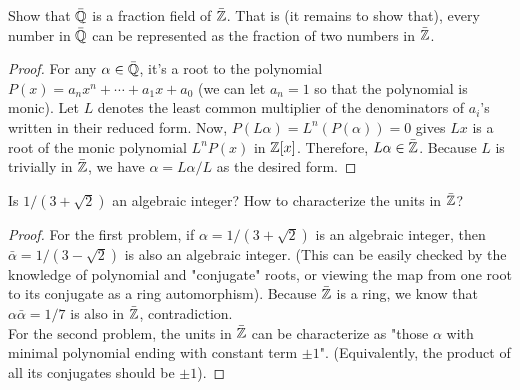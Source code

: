 \documentclass[12pt,twoside=semi,openright,numbers=noenddot]{scrbook}
\begin{document}
\begin{problem}
    Show that $\bar{\mathbb Q}$ is a fraction field of $\bar{\mathbb Z}$. That is (it remains to show that), every number in $\bar{\mathbb Q}$ can be 
    represented as the fraction of two numbers in $\bar{\mathbb Z}$.
\end{problem}
    \begin{proof}
        For any $\alpha \in \bar{\mathbb Q}$, it's a root to the polynomial $P(x) = a_n x^n + \cdots + a_1 x + a_0$ (we can let 
        $a_n = 1$ so that the polynomial is monic). 
        Let $L$ denotes the least common multiplier of the denominators of $a_i$'s written in their reduced form. 
        Now, $P(L\alpha) = L^n(P(\alpha)) = 0$ gives $Lx$ is a root of the monic polynomial $L^n P(x)$ in $\mathbb Z[x]$. Therefore, 
        $L\alpha \in \bar{\mathbb Z}$. Because $L$ is trivially in $\bar{\mathbb Z}$, we have $\alpha = L\alpha / L$ as the desired form.
    \end{proof}

\begin{problem}
    Is $1/(3+\sqrt{2})$ an algebraic integer? How to characterize the units in $\bar{\mathbb Z}$?
\end{problem}
    \begin{proof}
        For the first problem, if $\alpha = 1/(3+\sqrt{2})$ is an algebraic integer, then 
        $\bar{\alpha} = 1/(3-\sqrt{2})$ is also an algebraic integer. (This can be easily checked by the knowledge of polynomial and 
        "conjugate" roots, or viewing the map from one root to its conjugate as a ring automorphism). Because $\bar{\mathbb Z}$ is a ring, we know that $\alpha \bar{\alpha} = 1/7$ is also in $\bar{\mathbb Z}$, contradiction. \\
        For the second problem, the units in $\bar{\mathbb Z}$ can be characterize as "those $\alpha$ with minimal polynomial ending with constant term $\pm 1$". (Equivalently, the product of all its conjugates should be $\pm 1$).
    \end{proof}
\end{document}
